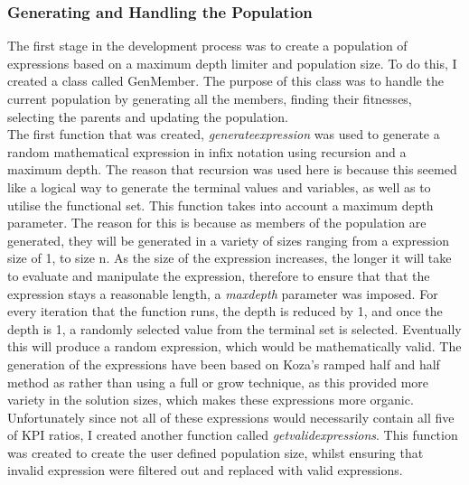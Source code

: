 \documentclass[11pt]{article}
\begin{document}
\subsubsection{Generating and Handling the Population}
The first stage in the development process was to create a population of expressions based on a maximum depth limiter and population size. To do this, I created a class called GenMember. The purpose of this class was to handle the current population by generating all the members, finding their fitnesses, selecting the parents and updating the population.\\
The first function that was created, \textit{generate\textunderscore expression }was used to generate a random mathematical expression in infix notation using recursion and a maximum depth. The reason that recursion was used here is because this seemed like a logical way to generate the terminal values and variables, as well as to utilise the functional set. This function takes into account a maximum depth parameter. The reason for this is because as members of the population are generated, they will be generated in a variety of sizes ranging from a expression size of 1, to size n. As the size of the expression increases, the longer it will take to evaluate and manipulate the expression,  therefore to ensure that that the expression stays a reasonable length, a \textit{max\textunderscore depth} parameter was imposed. For every iteration that the function runs, the depth is reduced by 1, and once the depth is 1, a randomly selected value from the terminal set is selected. Eventually this will produce a random expression, which would be mathematically valid. The generation of the expressions have been based on Koza's ramped half and half method as rather than using a full or grow technique, as this provided more variety in the solution sizes, which makes these expressions more organic. Unfortunately since not all of these expressions would  necessarily contain all five of KPI ratios, I created another function called \textit{get\textunderscore valid\textunderscore expressions}. This function was created to create the user defined population size, whilst ensuring that invalid expression were filtered out and replaced with valid expressions.\\
\\
\end{document}
